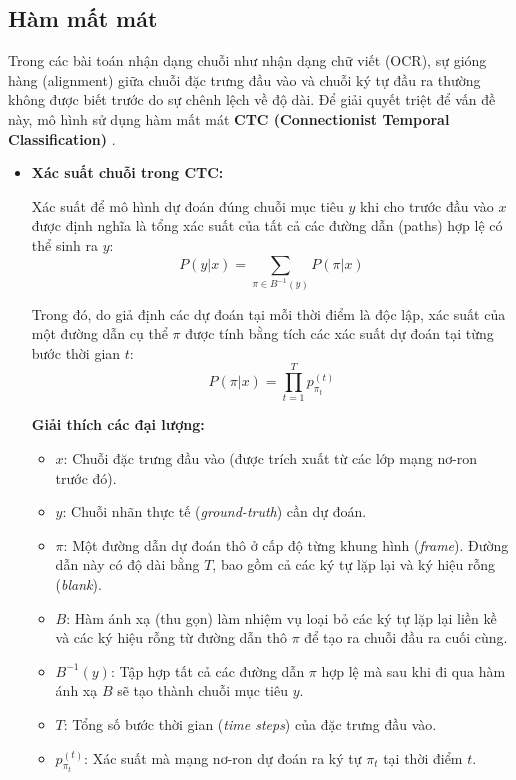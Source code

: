 \subsection{Hàm mất mát}

Trong các bài toán nhận dạng chuỗi như nhận dạng chữ viết (OCR), sự gióng hàng (alignment) giữa chuỗi đặc trưng đầu vào và chuỗi ký tự đầu ra thường không được biết trước do sự chênh lệch về độ dài. Để giải quyết triệt để vấn đề này, mô hình sử dụng hàm mất mát \textbf{CTC (Connectionist Temporal Classification)} \cite{Reference7}.

\begin{itemize}
    \item \textbf{Xác suất chuỗi trong CTC:}
    
    Xác suất để mô hình dự đoán đúng chuỗi mục tiêu $y$ khi cho trước đầu vào $x$ được định nghĩa là tổng xác suất của tất cả các đường dẫn (paths) hợp lệ có thể sinh ra $y$:
    $$P(y|x) = \sum_{\pi \in B^{-1}(y)} P(\pi|x)$$
    
    Trong đó, do giả định các dự đoán tại mỗi thời điểm là độc lập, xác suất của một đường dẫn cụ thể $\pi$ được tính bằng tích các xác suất dự đoán tại từng bước thời gian $t$:
    $$P(\pi|x) = \prod_{t=1}^{T} p_{\pi_t}^{(t)}$$

    \textbf{Giải thích các đại lượng:}
    \begin{itemize}
        \item $x$: Chuỗi đặc trưng đầu vào (được trích xuất từ các lớp mạng nơ-ron trước đó).
        \item $y$: Chuỗi nhãn thực tế (\textit{ground-truth}) cần dự đoán.
        \item $\pi$: Một đường dẫn dự đoán thô ở cấp độ từng khung hình (\textit{frame}). Đường dẫn này có độ dài bằng $T$, bao gồm cả các ký tự lặp lại và ký hiệu rỗng (\textit{blank}).
        \item $B$: Hàm ánh xạ (thu gọn) làm nhiệm vụ loại bỏ các ký tự lặp lại liền kề và các ký hiệu rỗng từ đường dẫn thô $\pi$ để tạo ra chuỗi đầu ra cuối cùng.
        \item $B^{-1}(y)$: Tập hợp tất cả các đường dẫn $\pi$ hợp lệ mà sau khi đi qua hàm ánh xạ $B$ sẽ tạo thành chuỗi mục tiêu $y$.
        \item $T$: Tổng số bước thời gian (\textit{time steps}) của đặc trưng đầu vào.
        \item $p_{\pi_t}^{(t)}$: Xác suất mà mạng nơ-ron dự đoán ra ký tự $\pi_t$ tại thời điểm $t$.
    \end{itemize}


\end{itemize}
